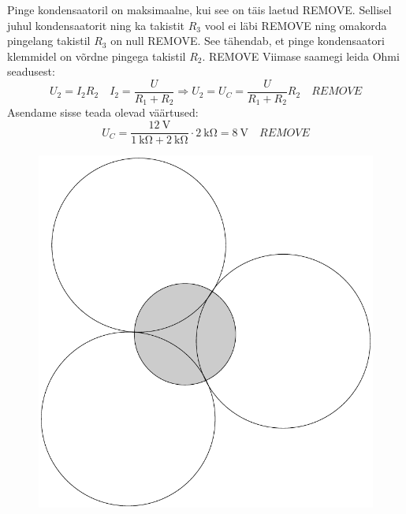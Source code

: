 \documentclass[10pt]{article}
\newcommand{\pp}[1]{REMOVE}
\begin{document}
\setAuthor{}

\solu
Pinge kondensaatoril on  maksimaalne, kui see on täis laetud \pp{1}. Sellisel juhul kondensaatorit ning ka takistit $R_3$ vool ei läbi \pp{1} ning omakorda pingelang takistil $R_3$ on null \pp{1}. See tähendab, et pinge kondensaatori klemmidel on võrdne pingega takistil $R_2$. \pp{2} Viimase saamegi leida Ohmi seadusest:
$$U_2=I_2R_2 \quad I_2=\frac{U}{R_1+R_2} \Rightarrow U_2=U_C=\frac{U}{R_1+R_2}R_2\quad\pp{2}$$
Asendame sisse teada olevad väärtused:
$$U_C=\frac{\SI{12}{\V}}{\SI{1}{\kilo\ohm}+\SI{2}{\kilo\ohm}}\cdot\SI{2}{\kilo\ohm}=\SI{8}{\V}\quad\pp{1}$$
\probend
\bigskip

\setAuthor{}

\solu
\begin{figure}
  \vspace{-25pt}
  \begin{center}
\includegraphics[scale=0.3]{2019-v3g-06-yl.pdf}
  \end{center}
  \vspace{-20pt}
\end{figure}
\end{document}
